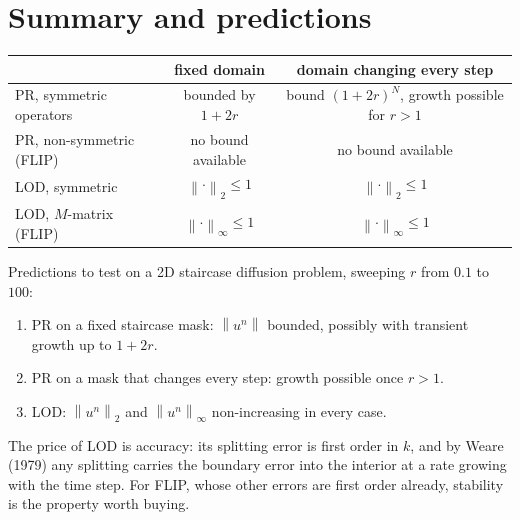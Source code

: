\documentclass[11pt]{article}
\theoremstyle{remark}
\newcommand{\norm}[1]{\left\lVert #1 \right\rVert}
\begin{document}
\section{Summary and predictions}

\begin{center}
\begin{tabular}{lcc}
  & fixed domain & domain changing every step \\[2pt]
  \hline
  PR, symmetric operators & bounded by $1 + 2r$ & bound $(1+2r)^N$, growth possible for $r > 1$ \\
  PR, non-symmetric (FLIP) & no bound available & no bound available \\
  LOD, symmetric & $\norm{\cdot}_2 \le 1$ & $\norm{\cdot}_2 \le 1$ \\
  LOD, $M$-matrix (FLIP) & $\norm{\cdot}_\infty \le 1$ & $\norm{\cdot}_\infty \le 1$ \\
\end{tabular}
\end{center}

\noindent Predictions to test on a 2D staircase diffusion problem, sweeping $r$ from $0.1$ to $100$:
\begin{enumerate}
  \item PR on a fixed staircase mask: $\norm{u^n}$ bounded, possibly with transient growth up to $1 + 2r$.
  \item PR on a mask that changes every step: growth possible once $r > 1$.
  \item LOD: $\norm{u^n}_2$ and $\norm{u^n}_\infty$ non-increasing in every case.
\end{enumerate}

\noindent The price of LOD is accuracy: its splitting error is first order in $k$, and by Weare (1979) any splitting carries the boundary error into the interior at a rate growing with the time step. For FLIP, whose other errors are first order already, stability is the property worth buying.
\end{document}
